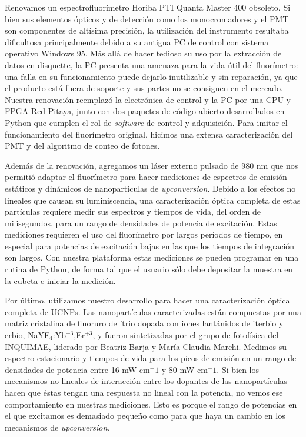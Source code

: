 \renewcommand{\tablename}{\textbf{Tabla}}

Renovamos un espectrofluorímetro Horiba PTI Quanta Master 400 obsoleto.
Si bien sus elementos ópticos y de detección como los monocromadores y el PMT son componentes de altísima precisión, la utilización del instrumento resultaba dificultosa principalmente debido a su antigua PC de control con sistema operativo Windows 95.
Más allá de hacer tedioso su uso por la extracción de datos en disquette, la PC presenta una amenaza para la vida útil del fluorímetro: una falla en su funcionamiento puede dejarlo inutilizable y sin reparación, ya que el producto está fuera de soporte y sus partes no se consiguen en el mercado.
Nuestra renovación reemplazó la electrónica de control y la PC por una CPU y FPGA Red Pitaya, junto con dos paquetes de código abierto desarrollados en Python que cumplen el rol de \textit{software} de control y adquisición.
Para imitar el funcionamiento del fluorímetro original, hicimos una extensa caracterización del PMT y del algoritmo de conteo de fotones.

Además de la renovación, agregamos un láser externo pulsado de 980 nm que nos permitió adaptar el fluorímetro para hacer mediciones de espectros de emisión estáticos y dinámicos de nanopartículas de \textit{upconversion}.
Debido a los efectos no lineales que causan su luminiscencia, una caracterización óptica completa de estas partículas requiere medir sus espectros y tiempos de vida, del orden de milisegundos, para un rango de densidades de potencia de excitación.
Estas mediciones requieren el uso del fluorímetro por largos períodos de tiempo, en especial para potencias de excitación bajas en las que los tiempos de integración son largos.
Con nuestra plataforma estas mediciones se pueden programar en una rutina de Python, de forma tal que el usuario sólo debe depositar la muestra en la cubeta e iniciar la medición.

Por último, utilizamos nuestro desarrollo para hacer una caracterización óptica completa de UCNPs.
Las nanopartículas caracterizadas están compuestas por una matriz cristalina de fluoruro de ítrio dopada con iones lantánidos de iterbio y erbio, NaYF$_4$:Yb$^{+3}$,Er$^{+3}$, y fueron sintetizadas por el grupo de fotofísica del INQUIMAE, liderado por Beatriz Barja y María Claudia Marchi. 
Medimos su espectro estacionario y tiempos de vida para los picos de emisión en un rango de densidades de potencia entre 16 mW cm$^-1$ y 80 mW cm$^-1$.
Si bien los mecanismos no lineales de interacción entre los dopantes de las nanopartículas hacen que éstas tengan una respuesta no lineal con la potencia, no vemos ese comportamiento en nuestras mediciones.
Esto es porque el rango de potencias en el que excitamos es demasiado pequeño como para que haya un cambio en los mecanismos de \textit{upconversion}.


